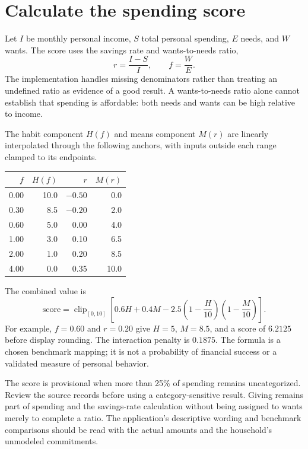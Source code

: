 \section{Calculate the spending score}
Let \(I\) be monthly personal income, \(S\) total personal spending, \(E\) needs, and \(W\) wants. The score uses the savings rate and wants-to-needs ratio,
\[
 r=\frac{I-S}{I},\qquad f=\frac{W}{E}.
\]
The implementation handles missing denominators rather than treating an undefined ratio as evidence of a good result. A wants-to-needs ratio alone cannot establish that spending is affordable: both needs and wants can be high relative to income.

The habit component \(H(f)\) and means component \(M(r)\) are linearly interpolated through the following anchors, with inputs outside each range clamped to its endpoints.

\begin{center}
\begin{tabular}{@{}rrrr@{}}
\toprule \(f\) & \(H(f)\) & \(r\) & \(M(r)\)\\\midrule
0.00 & 10.0 & $-0.50$ & 0.0\\
0.30 & 8.5 & $-0.20$ & 2.0\\
0.60 & 5.0 & 0.00 & 4.0\\
1.00 & 3.0 & 0.10 & 6.5\\
2.00 & 1.0 & 0.20 & 8.5\\
4.00 & 0.0 & 0.35 & 10.0\\\bottomrule
\end{tabular}
\end{center}

The combined value is
\begin{equation}
 \mathrm{score}=\operatorname{clip}_{[0,10]}\left[
 0.6H+0.4M-2.5\left(1-\frac{H}{10}\right)\left(1-\frac{M}{10}\right)\right].
\end{equation}
For example, \(f=0.60\) and \(r=0.20\) give \(H=5\), \(M=8.5\), and a score of \(6.2125\) before display rounding. The interaction penalty is \(0.1875\). The formula is a chosen benchmark mapping; it is not a probability of financial success or a validated measure of personal behavior.

The score is provisional when more than 25\% of spending remains uncategorized. Review the source records before using a category-sensitive result. Giving remains part of spending and the savings-rate calculation without being assigned to wants merely to complete a ratio. The application's descriptive wording and benchmark comparisons should be read with the actual amounts and the household's unmodeled commitments.

